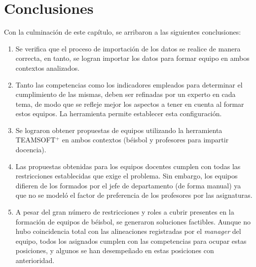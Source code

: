 \section{Conclusiones}
Con la culminación de este capítulo, se arribaron a las siguientes conclusiones:
\begin{enumerate}
	\item Se verifica que el proceso de importación de los datos se realice de manera correcta, en tanto, se logran importar los datos para formar equipo en ambos contextos analizados.
	\item Tanto las competencias como los indicadores empleados para determinar el cumplimiento de las mismas, deben ser refinadas por un experto en cada tema, de modo que se refleje mejor los aspectos a tener en cuenta al formar estos equipos. La herramienta permite establecer esta configuración.
	\item Se lograron obtener propuestas de equipos utilizando la herramienta TEAMSOFT$^+$ en ambos contextos (béisbol y profesores para impartir docencia).
	\item Las propuestas obtenidas para los equipos docentes cumplen con todas las restricciones establecidas que exige el problema. Sin embargo, los equipos difieren de los formados por el jefe de departamento (de forma manual) ya que no se modeló el factor de preferencia de los profesores por las asignaturas.
	\item A pesar del gran número de restricciones y roles a cubrir presentes en la formación de equipos de béisbol, se generaron soluciones factibles. Aunque no hubo coincidencia total con las alineaciones registradas por el \textit{manager} del equipo, todos los asignados cumplen con las competencias para ocupar estas posiciones, y algunos se han desempeñado en estas posiciones con anterioridad.
\end{enumerate}

